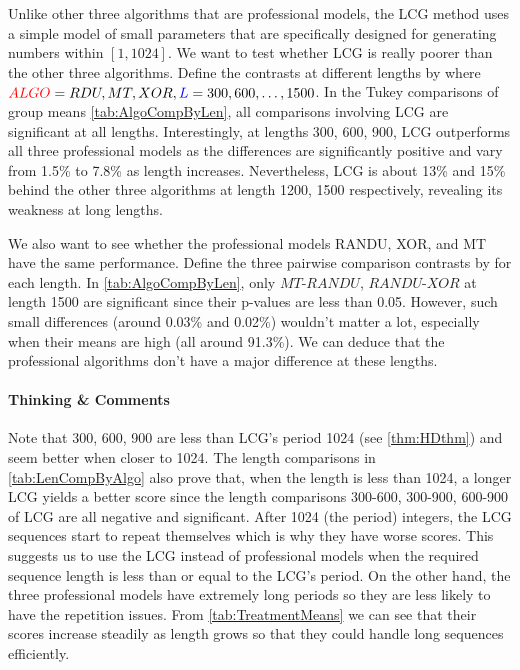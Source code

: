 \documentclass{report}
\begin{document}
Unlike other three algorithms that are professional models, the LCG method uses a simple model of small parameters that are specifically designed for generating numbers within $[1,1024]$. We want to test whether LCG is really poorer than the other three algorithms. Define the contrasts at different lengths by
where $\mathcolor{red}{ALGO}=RDU,MT,XOR, \mathcolor{blue}{L}=300,600,\dots,1500$. In the Tukey comparisons of group means \ref{tab:AlgoCompByLen}, all comparisons involving LCG are significant at all lengths. Interestingly, at lengths 300, 600, 900, LCG outperforms all three professional models as the differences are significantly positive and vary from 1.5\% to 7.8\% as length increases. Nevertheless, LCG is about 13\% and 15\% behind the other three algorithms at length 1200, 1500 respectively, revealing its weakness at long lengths.

We also want to see whether the professional models RANDU, XOR, and MT have the same performance. Define the three pairwise comparison contrasts by
for each length. In \ref{tab:AlgoCompByLen}, only $MT$-$RANDU$, $RANDU$-$XOR$ at length 1500 are significant since their p-values are less than 0.05. However, such small differences (around 0.03\% and 0.02\%) wouldn't matter a lot, especially when their means are high (all around 91.3\%). We can deduce that the professional algorithms don't have a major difference at these lengths.


\paragraph{Thinking \& Comments} Note that 300, 600, 900 are less than LCG's period 1024 (see \ref{thm:HDthm}) and seem better when closer to 1024. The length comparisons in \ref{tab:LenCompByAlgo} also prove that, when the length is less than 1024, a longer LCG yields a better score since the length comparisons 300-600, 300-900, 600-900 of LCG are all negative and significant. After 1024 (the period) integers, the LCG sequences start to repeat themselves which is why they have worse scores. This suggests us to use the LCG instead of professional models when the required sequence length is less than or equal to the LCG's period. On the other hand, the three professional models have extremely long periods so they are less likely to have the repetition issues. From \ref{tab:TreatmentMeans} we can see that their scores increase steadily as length grows so that they could handle long sequences efficiently.
\end{document}
